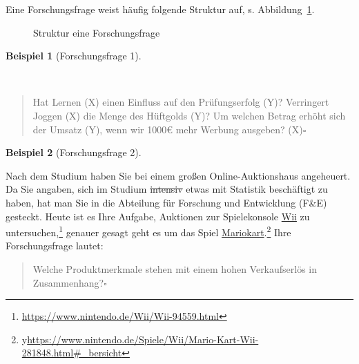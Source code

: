 \documentclass[
  a4paper,
]{scrbook}
\theoremstyle{definition}
\newtheorem{example}{Beispiel}[chapter]
\theoremstyle{definition}
\theoremstyle{definition}
\theoremstyle{remark}
\begin{document}
Eine Forschungsfrage weist häufig folgende Struktur auf, s.
Abbildung~\ref{fig-fo-struktur}.

\begin{figure}


\caption{\label{fig-fo-struktur}Struktur eine Forschungsfrage}

\end{figure}%

\begin{example}[Forschungsfrage
1]\protect\hypertarget{exm-fofrage1}{}\label{exm-fofrage1}

~

\begin{quote}
Hat Lernen (X) einen Einfluss auf den Prüfungserfolg (Y)? Verringert
Joggen (X) die Menge des Hüftgolds (Y)? Um welchen Betrag erhöht sich
der Umsatz (Y), wenn wir 1000€ mehr Werbung ausgeben? (X)\(\square\)
\end{quote}

\end{example}

\begin{example}[Forschungsfrage
2]\protect\hypertarget{exm-fofrage2}{}\label{exm-fofrage2}

Nach dem Studium haben Sie bei einem großen Online-Auktionshaus
angeheuert. Da Sie angaben, sich im Studium \st{intensiv} etwas mit
Statistik beschäftigt zu haben, hat man Sie in die Abteilung für
Forschung und Entwicklung (F\&E) gesteckt. Heute ist es Ihre Aufgabe,
Auktionen zur Spielekonsole
\href{https://www.nintendo.de/Wii/Wii-94559.html}{Wii} zu
untersuchen,\footnote{\url{https://www.nintendo.de/Wii/Wii-94559.html}}
genauer gesagt geht es um das Spiel
\href{https://www.nintendo.de/Spiele/Wii/Mario-Kart-Wii-281848.html\#_bersicht}{Mariokart}.\footnote{y\url{https://www.nintendo.de/Spiele/Wii/Mario-Kart-Wii-281848.html\#_bersicht}}
Ihre Forschungsfrage lautet:

\begin{quote}
Welche Produktmerkmale stehen mit einem hohen Verkaufserlös in
Zusammenhang?\(\square\)
\end{quote}

\end{example}
\end{document}
